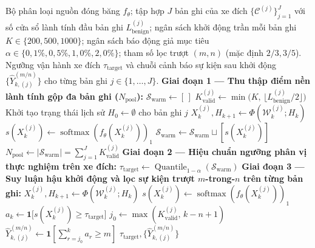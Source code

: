 \documentclass[12pt, a4paper, reqno, oneside]{book}
\begin{document}
\begin{algorithm}[htbp]
\caption{Hiệu chuẩn nền lành tính gộp đa bản ghi ($N_{\text{pool}}$) kết hợp bộ lọc sự kiện trượt $m$-trong-$n$}\label{alg:benign-cal-mofn}
{\small\linespread{1.05}\selectfont
\begin{algorithmic}[1]
\Require Bộ phân loại nguồn đóng băng $f_\theta$; tập hợp $J$ bản ghi của xe đích $\{\mathcal{C}^{(j)}\}_{j=1}^J$ với số cửa sổ lành tính đầu bản ghi $L_{\text{benign}}^{(j)}$; ngân sách khởi động trần mỗi bản ghi $K \in \{200, 500, 1000\}$; ngân sách báo động giả mục tiêu $\alpha \in \{0{,}1\%, 0{,}5\%, 1{,}0\%, 2{,}0\%\}$; tham số lọc trượt $(m, n)$ (mặc định $2/3, 3/5$).
\Ensure Ngưỡng vận hành xe đích $\tau_{\text{target}}$ và chuỗi cảnh báo sự kiện sau khởi động $\{\widehat{Y}_{k, (j)}^{(m/n)}\}$ cho từng bản ghi $j \in \{1, \ldots, J\}$.
\State \textbf{Giai đoạn 1 --- Thu thập điểm nền lành tính gộp đa bản ghi ($N_{\text{pool}}$):}
\State $\mathcal{S}_{\text{warm}} \leftarrow [\,]$ 
    \State $K_{\text{valid}}^{(j)} \leftarrow \min\big(K,\, \lfloor L_{\text{benign}}^{(j)} / 2 \rfloor\big)$ 
    \State Khởi tạo trạng thái lịch sử $H_0 \leftarrow \emptyset$ cho bản ghi $j$
        \State $X_k^{(j)}, H_{k+1} \leftarrow \Phi(\mathcal{W}_k^{(j)}; H_k)$ 
        \State $s(X_k^{(j)}) \leftarrow \operatorname{softmax}(f_\theta(X_k^{(j)}))_1$ 
        \State $\mathcal{S}_{\text{warm}} \leftarrow \mathcal{S}_{\text{warm}} \sqcup [s(X_k^{(j)})]$
    \EndFor
\EndFor
\State $N_{\text{pool}} \leftarrow |\mathcal{S}_{\text{warm}}| = \sum_{j=1}^J K_{\text{valid}}^{(j)}$ 
\State \textbf{Giai đoạn 2 --- Hiệu chuẩn ngưỡng phân vị thực nghiệm trên xe đích:}
\State $\tau_{\text{target}} \leftarrow \operatorname{Quantile}_{1-\alpha}(\mathcal{S}_{\text{warm}})$ 
\State \textbf{Giai đoạn 3 --- Suy luận hậu khởi động và lọc sự kiện trượt $m$-trong-$n$ trên từng bản ghi:}
        \State $X_k^{(j)}, H_{k+1} \leftarrow \Phi(\mathcal{W}_k^{(j)}; H_k)$
        \State $s(X_k^{(j)}) \leftarrow \operatorname{softmax}(f_\theta(X_k^{(j)}))_1$
        \State $a_k \leftarrow \mathbf{1}\big[s(X_k^{(j)}) \ge \tau_{\text{target}}\big]$ 
        \State $j_0 \leftarrow \max(K_{\text{valid}}^{(j)},\, k - n + 1)$
        \State $\widehat{Y}_{k, (j)}^{(m/n)} \leftarrow \mathbf{1}\left[\sum_{r=j_0}^{k} a_r \ge m\right]$ 
    \EndFor
\EndFor
\State \Return $\tau_{\text{target}}, \{\widehat{Y}_{k, (j)}^{(m/n)}\}$
\end{algorithmic}}
\end{algorithm}
\end{document}
